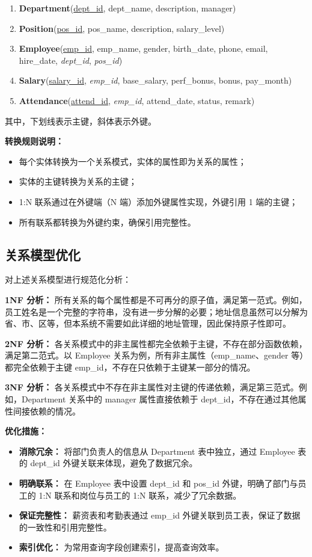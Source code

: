 \documentclass[12pt,a4paper]{article}
\begin{document}
\begin{enumerate}
  \item \textbf{Department}(\underline{dept\_id}, dept\_name, description, manager)
  \item \textbf{Position}(\underline{pos\_id}, pos\_name, description, salary\_level)
  \item \textbf{Employee}(\underline{emp\_id}, emp\_name, gender, birth\_date, phone, email, hire\_date, \textit{dept\_id}, \textit{pos\_id})
  \item \textbf{Salary}(\underline{salary\_id}, \textit{emp\_id}, base\_salary, perf\_bonus, bonus, pay\_month)
  \item \textbf{Attendance}(\underline{attend\_id}, \textit{emp\_id}, attend\_date, status, remark)
\end{enumerate}

其中，下划线表示主键，斜体表示外键。

\textbf{转换规则说明：}
\begin{itemize}
  \item 每个实体转换为一个关系模式，实体的属性即为关系的属性；
  \item 实体的主键转换为关系的主键；
  \item 1:N 联系通过在外键端（N 端）添加外键属性实现，外键引用 1 端的主键；
  \item 所有联系都转换为外键约束，确保引用完整性。
\end{itemize}

\subsection{关系模型优化}

对上述关系模型进行规范化分析：

\textbf{1NF 分析：} 所有关系的每个属性都是不可再分的原子值，满足第一范式。例如，员工姓名是一个完整的字符串，没有进一步分解的必要；地址信息虽然可以分解为省、市、区等，但本系统不需要如此详细的地址管理，因此保持原子性即可。

\textbf{2NF 分析：} 各关系模式中的非主属性都完全依赖于主键，不存在部分函数依赖，满足第二范式。以 Employee 关系为例，所有非主属性（emp\_name、gender 等）都完全依赖于主键 emp\_id，不存在只依赖于主键某一部分的情况。

\textbf{3NF 分析：} 各关系模式中不存在非主属性对主键的传递依赖，满足第三范式。例如，Department 关系中的 manager 属性直接依赖于 dept\_id，不存在通过其他属性间接依赖的情况。

\textbf{优化措施：}
\begin{itemize}
  \item \textbf{消除冗余：} 将部门负责人的信息从 Department 表中独立，通过 Employee 表的 dept\_id 外键关联来体现，避免了数据冗余。
  \item \textbf{明确联系：} 在 Employee 表中设置 dept\_id 和 pos\_id 外键，明确了部门与员工的 1:N 联系和岗位与员工的 1:N 联系，减少了冗余数据。
  \item \textbf{保证完整性：} 薪资表和考勤表通过 emp\_id 外键关联到员工表，保证了数据的一致性和引用完整性。
  \item \textbf{索引优化：} 为常用查询字段创建索引，提高查询效率。
\end{itemize}
\end{document}
